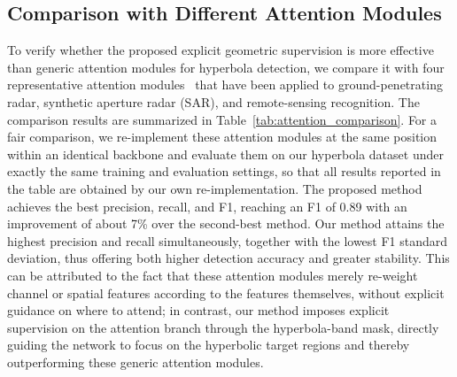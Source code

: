 \documentclass[lettersize,journal]{IEEEtran}
\begin{document}
\subsection{Comparison with Different Attention Modules}
To verify whether the proposed explicit geometric supervision is more effective than
generic attention modules for hyperbola detection, we compare it with four representative
attention modules~\cite{SE,CBAM,Non-local,CA} that have been applied to ground-penetrating radar,
synthetic aperture radar (SAR), and remote-sensing recognition. The comparison results are summarized in Table~\ref{tab:attention_comparison}.
For a fair comparison, we re-implement these attention modules at the same position within an identical backbone 
and evaluate them on our hyperbola dataset under exactly the same training and evaluation settings, 
so that all results reported in the table are obtained by our own re-implementation. 
The proposed method achieves the best precision, recall, and F1, 
reaching an F1 of 0.89 with an improvement of about 7\% over the second-best method. 
Our method attains the highest precision and recall simultaneously,
together with the lowest F1 standard deviation, thus offering both higher detection accuracy and greater stability. 
This can be attributed to the fact that these attention modules merely re-weight channel or spatial features
according to the features themselves, without explicit guidance on where to attend; in contrast,
our method imposes explicit supervision on the attention branch through the hyperbola-band mask, 
directly guiding the network to focus on the hyperbolic target regions and 
thereby outperforming these generic attention modules.
\end{document}
